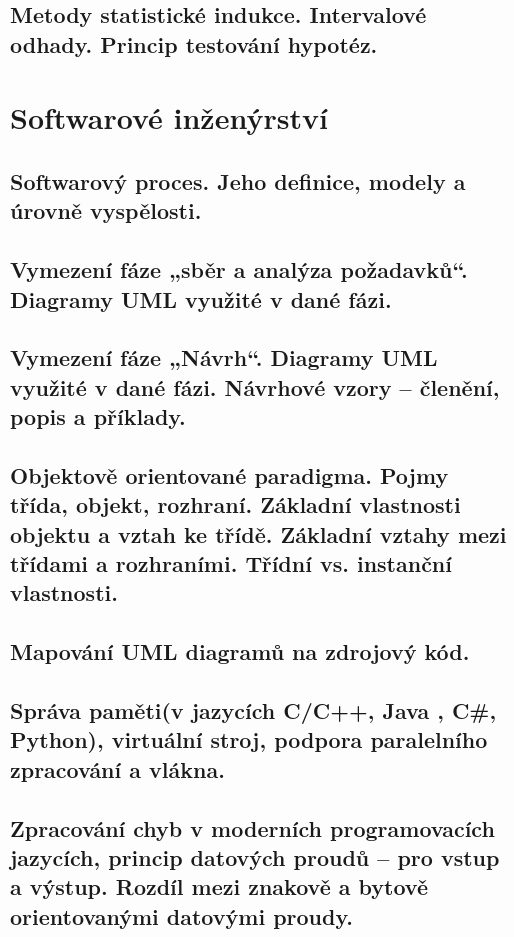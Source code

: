 \documentclass[openany]{book}
\begin{document}
\section{Metody statistické indukce. Intervalové odhady. Princip testování hypotéz.}

\chapter{Softwarové inženýrství}

\section{Softwarový proces. Jeho definice, modely a úrovně vyspělosti.}

\section{Vymezení fáze „sběr a analýza požadavků“. Diagramy UML využité v dané fázi.}

\section{Vymezení fáze „Návrh“. Diagramy UML využité v dané fázi. Návrhové vzory – členění, popis a příklady. }

\section{Objektově orientované paradigma. Pojmy třída, objekt, rozhraní. Základní vlastnosti objektu a vztah ke třídě. Základní vztahy mezi třídami a rozhraními. Třídní vs. instanční vlastnosti.}

\section{Mapování UML diagramů na zdrojový kód.}

\section{Správa paměti(v jazycích C/C++, Java , C\#, Python), virtuální stroj, podpora paralelního zpracování a vlákna.}

\section{Zpracování chyb v moderních programovacích jazycích, princip datových proudů – pro vstup a výstup. Rozdíl mezi znakově a bytově orientovanými datovými proudy.}
\end{document}
